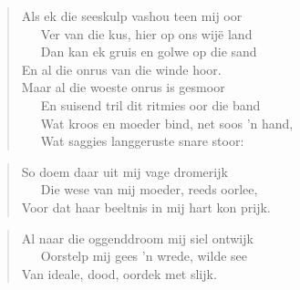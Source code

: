 \begin{verse}
Als ek die seeskulp vashou teen mij oor \\ 
\ \ \ Ver van die kus, hier op ons wijë land \\ 
\ \ \ Dan kan ek gruis en golwe op die sand \\ 
En al die onrus van die winde hoor. \\ 
Maar al die woeste onrus is gesmoor \\ 
\ \ \ En suisend tril dit ritmies oor die band \\ 
\ \ \ Wat kroos en moeder bind, net soos ’n hand, \\ 
\ \ \ Wat saggies langgeruste snare stoor: \\ 
\end{verse}

\begin{verse}
So doem daar uit mij vage dromerijk \\ 
\ \ \ Die wese van mij moeder, reeds oorlee, \\ 
Voor dat haar beeltnis in mij hart kon prijk. \\ 
\end{verse}

\begin{verse}
Al naar die oggenddroom mij siel ontwijk \\ 
\ \ \ Oorstelp mij gees ’n wrede, wilde see \\ 
Van ideale, dood, oordek met slijk. \\ 
\end{verse}